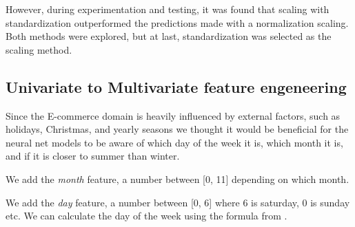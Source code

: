 However, during experimentation and testing, it was found that scaling with standardization
outperformed the predictions made with a normalization scaling.
Both methods were explored, but at last, standardization was selected as the scaling method.

\subsection{Univariate to Multivariate feature engeneering}
Since the E-commerce domain is heavily influenced by external factors, such as
holidays, Christmas, and yearly seasons we thought it would be beneficial
for the neural net models to be aware of which day of the week it is,
which month it is, and if it is closer to summer than winter.

We add the \textit{month} feature, a number between [0, 11] depending on which month.

We add the \textit{day} feature, a number between [0, 6] where 6 is saturday, 0 is sunday etc.
We can calculate the day of the week using the formula 
from .

